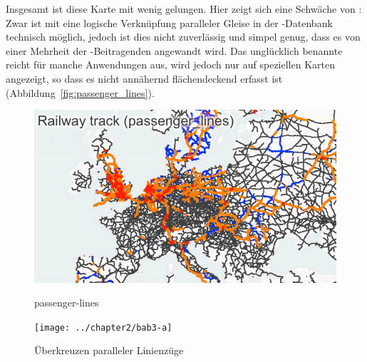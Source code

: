 \documentclass[../main/thesis.tex]{subfiles}
\begin{document}
Insgesamt ist diese Karte mit  wenig gelungen. Hier zeigt sich eine Schwäche von \osm: Zwar ist mit  eine logische Verknüpfung paralleler Gleise in der \osm-Datenbank technisch möglich, jedoch ist dies nicht zuverlässig und simpel genug, dass es von einer Mehrheit der \osm-Beitragenden angewandt wird. Das unglücklich benannte  reicht für manche Anwendungen aus, wird jedoch nur auf speziellen Karten angezeigt,
so dass es nicht annähernd flächendeckend erfasst ist (Abbildung~\ref{fig:passenger_lines}).

\begin{figure}[ht]
  \begin{minipage}{.5\linewidth}
    \centering
    \includegraphics[width=\ScaleIfNeeded]{../chapter2/passenger_lines-europe}
    \caption{passenger-lines}\label{fig:passenger_lines}
  \end{minipage}%
  \begin{minipage}{.5\linewidth}
    \centering
    \texttt{[image: ../chapter2/bab3-a]}
    \caption{Überkreuzen paralleler Linienzüge}\label{fig:bab3-b}
  \end{minipage}
\end{figure}




\end{document}
